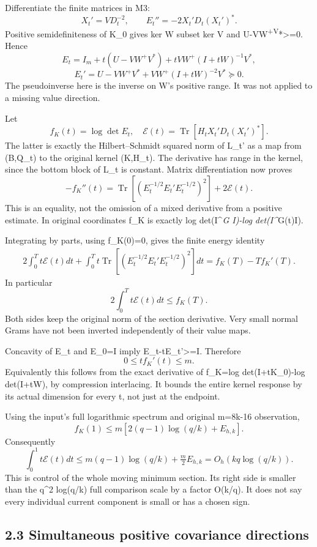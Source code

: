 Differentiate the finite matrices in M3: \[
 X_t'=V D_t^{-2},\qquad
 E_t''=-2X_t'D_t(X_t')^*.
 \tag{M5}
\] Positive semidefiniteness of K\_0 gives ker W subset ker V and U-VW\textsuperscript{+V}*\textgreater=0. Hence \[
 E_t=I_m+t(U-VW^+V^*)+tVW^+(I+tW)^{-1}V^*,
\] \[
 E_t'=U-VW^+V^*+VW^+(I+tW)^{-2}V^*\succeq0.
 \tag{M6}
\] The pseudoinverse here is the inverse on W's positive range. It was not applied to a missing value direction.

Let \[
 f_K(t)=\log\det E_t,
\quad \mathcal E(t)=\operatorname{Tr}[H_t X_t'D_t(X_t')^*].
\] The latter is exactly the Hilbert--Schmidt squared norm of L\_t' as a map from (B,Q\_t) to the original kernel (K,H\_t). The derivative has range in the kernel, since the bottom block of L\_t is constant. Matrix differentiation now proves \[
 \boxed{-f_K''(t)
 =\operatorname{Tr}[(E_t^{-1/2}E_t'E_t^{-1/2})^2]
   +2\mathcal E(t).}\tag{M7}
\] This is an equality, not the omission of a mixed derivative from a positive estimate. In original coordinates f\_K is exactly log det(I\^{}\emph{G I)-log det(I\^{}}G(t)I).

Integrating by parts, using f\_K(0)=0, gives the finite energy identity \[
 \boxed{\begin{aligned}
 2\int_0^T t\mathcal E(t)dt
 +\int_0^T t\operatorname{Tr}[(E_t^{-1/2}E_t'E_t^{-1/2})^2]dt
 =f_K(T)-T f_K'(T).
 \end{aligned}}\tag{M8}
\] In particular \[
 2\int_0^T t\mathcal E(t)dt\le f_K(T).
 \tag{M9}
\] Both sides keep the original norm of the section derivative. Very small normal Grams have not been inverted independently of their value maps.

Concavity of E\_t and E\_0=I imply E\_t-tE\_t'\textgreater=I. Therefore \[
 \boxed{0\le t f_K'(t)\le m.}\tag{M10}
\] Equivalently this follows from the exact derivative of f\_K=log det(I+tK\_0)-log det(I+tW), by compression interlacing. It bounds the entire kernel response by its actual dimension for every t, not just at the endpoint.

Using the input's full logarithmic spectrum and original m=8k-16 observation, \[
 f_K(1)\le m[2(q-1)\log(q/k)+E_{h,k}].
\] Consequently \[
 \boxed{\int_0^1t\mathcal E(t)dt
 \le m(q-1)\log(q/k)+\tfrac m2E_{h,k}
 =O_h(kq\log(q/k)).}\tag{M11}
\] This is control of the whole moving minimum section. Its right side is smaller than the q\^{}2 log(q/k) full comparison scale by a factor O(k/q). It does not say every individual current component is small or has a chosen sign.

\subsection{2.3 Simultaneous positive covariance directions}\label{simultaneous-positive-covariance-directions}

